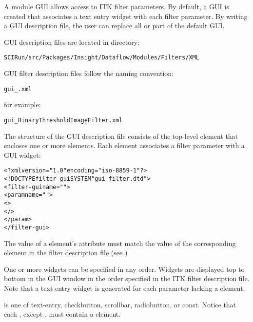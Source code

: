 A module GUI allows access to ITK filter parameters.  By default, a
GUI is created that associates a text entry widget with each filter
parameter.  By writing a GUI description file, the user can replace
all or part of the default GUI.  

\sr{} GUI description files are located in directory:

\begin{alltt}
  SCIRun/src/Packages/Insight/Dataflow/Modules/Filters/XML
\end{alltt}

\sr{} GUI filter description files follow the naming
convention:

\begin{alltt}
  gui\_.xml
\end{alltt}

for example:

\begin{alltt}
  gui\_BinaryThresholdImageFilter.xml
\end{alltt}

The structure of the GUI description file consists of the
top-level element  that encloses one or more
 elements.  Each  element
associates a filter parameter with a GUI widget:

\begin{alltt}
  <?xml version="1.0"  encoding="iso-8859-1"?>
  <!DOCTYPE filter-gui SYSTEM "gui_filter.dtd">
  <filter-gui name="">
    <param name="">
      <>
      \velide
      </>
      \velide
    </param>
    \velide  
  </filter-gui>
\end{alltt}

The value of a  element's 
attribute must match the value of the corresponding
 element in the filter description file (see
)

One or more widgets can be specified in any order. Widgets are
displayed top to bottom in the GUI window in the order specified in
the ITK filter description file. Note that a text entry widget is
generated for each parameter lacking a  element.

 is one of text-entry, checkbutton,
scrollbar, radiobutton, or const. Notice that each
, except , must
contain a  element.

